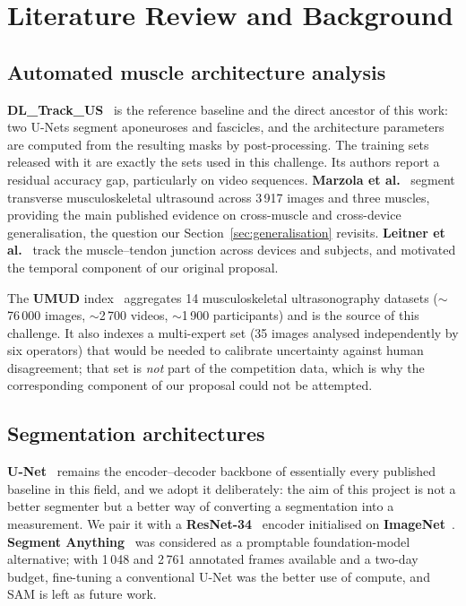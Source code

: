 \documentclass[11pt,a4paper]{article}
\begin{document}
\section{Literature Review and Background}

\subsection{Automated muscle architecture analysis}

\textbf{DL\_Track\_US}~\citep{ritsche2024dltrack} is the reference baseline and
the direct ancestor of this work: two U-Nets segment aponeuroses and fascicles,
and the architecture parameters are computed from the resulting masks by
post-processing. The training sets released with it are exactly the sets used in
this challenge. Its authors report a residual accuracy gap, particularly on video
sequences. \textbf{Marzola et al.}~\citep{marzola2021segmentation} segment
transverse musculoskeletal ultrasound across 3\,917 images and three muscles,
providing the main published evidence on cross-muscle and cross-device
generalisation, the question our Section~\ref{sec:generalisation} revisits.
\textbf{Leitner et al.}~\citep{leitner2022mtj} track the muscle--tendon junction
across devices and subjects, and motivated the temporal component of our original
proposal.

The \textbf{UMUD} index~\citep{ritsche2026umud} aggregates 14 musculoskeletal
ultrasonography datasets ($\sim$76\,000 images, $\sim$2\,700 videos,
$\sim$1\,900 participants) and is the source of this challenge. It also indexes
a multi-expert set (35 images analysed independently by six operators) that would
be needed to calibrate uncertainty against human disagreement; that set is
\emph{not} part of the competition data, which is why the corresponding component
of our proposal could not be attempted.

\subsection{Segmentation architectures}

\textbf{U-Net}~\citep{ronneberger2015unet} remains the encoder--decoder backbone
of essentially every published baseline in this field, and we adopt it
deliberately: the aim of this project is not a better segmenter but a better way
of converting a segmentation into a measurement. We pair it with a
\textbf{ResNet-34}~\citep{he2016resnet} encoder initialised on
\textbf{ImageNet}~\citep{deng2009imagenet}.
\textbf{Segment Anything}~\citep{kirillov2023sam} was considered as a promptable
foundation-model alternative; with 1\,048 and 2\,761 annotated frames available
and a two-day budget, fine-tuning a conventional U-Net was the better use of
compute, and SAM is left as future work.
\end{document}

